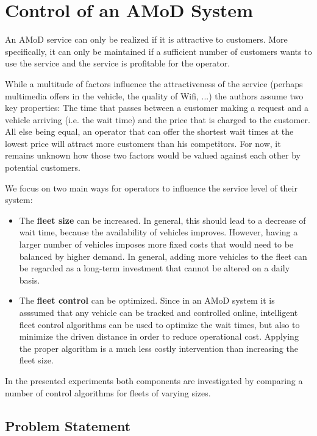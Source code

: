 \section{Control of an AMoD System}
\label{sec:background}

An AMoD service can only be realized if it is attractive to customers. More
specifically, it can only be maintained if a sufficient number of customers
wants to use the service and the service is profitable for the operator.

While a multitude of factors influence the attractiveness of the service (perhaps
multimedia offers in the vehicle, the quality of Wifi, ...) the authors assume
two key properties: The time that passes between a customer making a request
and a vehicle arriving (i.e. the wait time) and the price that is charged to
the customer. All else being equal, an operator that can offer the shortest wait
times at the lowest price will attract more customers than his competitors. For
now, it remains unknown how those two factors would be valued against each other
by potential customers.

We focus on two main ways for operators to influence the service level of their system:

\begin{itemize}
\item The \textbf{fleet size} can be increased. In general, this should lead to
a decrease of wait time, because the availability of vehicles improves. However,
having a larger number of vehicles imposes more fixed costs that would need to be
balanced by higher demand. In general, adding more vehicles to the fleet can be
regarded as a long-term investment that cannot be altered on a daily basis.
\item The \textbf{fleet control} can be optimized. Since in an AMoD system it is
asssumed that any vehicle can be tracked and controlled online, intelligent fleet
control algorithms can be used to optimize the wait times, but also to minimize the
driven distance in order to reduce operational cost. Applying the proper algorithm is a much
less costly intervention than increasing the fleet size.
\end{itemize}

In the presented experiments both components are investigated by comparing a number
of control algorithms for fleets of varying sizes.

\subsection{Problem Statement}

